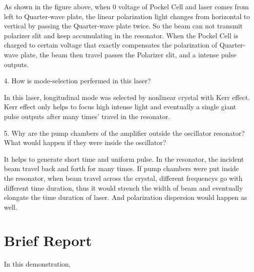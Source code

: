 \documentclass{article}
\begin{document}
As shown in the figure above, when 0 voltage of Pockel Cell and laser comes from left to Quarter-wave plate, the linear polarization light changes from horizontal to vertical by passing the Quarter-wave plate twice. So the beam can not transmit polarizer slit and keep accumulating in the resonator. When the Pockel Cell is charged to certain voltage that exactly compensates the polarization of Quarter-wave plate, the beam then travel passes the Polarizer slit, and a intense pulse outputs. \\
\par 
4. How is mode-selection perfermed in this laser?\par 
In this laser, longitudinal mode was selected by nonlinear crystal with Kerr effect. Kerr effect only helps to focus high intense light and eventually a single giant pulse outputs after many times' travel in the resonator. \\
\par 
5. Why are the pump chambers of the amplifier outside the oscillator resonator? What would happen if they were inside the oscillator?\par 
It helps to generate short time and uniform pulse. In the resonator, the incident beam travel back and forth for many times. If pump chambers were put inside the resonator, when beam travel across the crystal, different frequencys go with different time duration, thus it would strench the width of beam and eventually elongate the time duration of laser. And polarization dispersion would happen as well.\\
\par 
\section{Brief Report}
In this demonstration,
\end{document}
